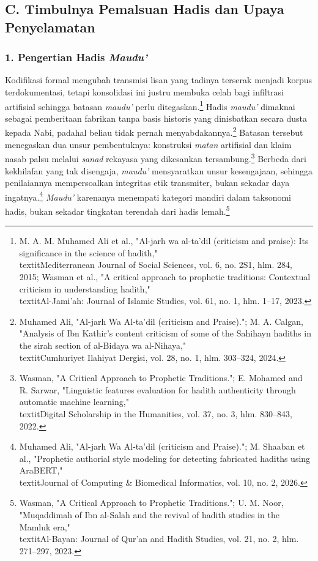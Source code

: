 \subsection*{C. Timbulnya Pemalsuan Hadis dan Upaya Penyelamatan}

\subsubsection*{1. Pengertian Hadis \textit{Maudu'}}

Kodifikasi formal mengubah transmisi lisan yang tadinya terserak menjadi korpus terdokumentasi, tetapi konsolidasi ini justru membuka celah bagi infiltrasi artifisial sehingga batasan \textit{maudu'} perlu ditegaskan.\footnote{M. A. M. Muhamed Ali et al., "Al-jarh wa al-ta'dil (criticism and praise): Its significance in the science of hadith," \\textit{Mediterranean Journal of Social Sciences}, vol. 6, no. 2S1, hlm. 284, 2015; Wasman et al., "A critical approach to prophetic traditions: Contextual criticism in understanding hadith," \\textit{Al-Jami'ah: Journal of Islamic Studies}, vol. 61, no. 1, hlm. 1--17, 2023.} Hadis \textit{maudu'} dimaknai sebagai pemberitaan fabrikan tanpa basis historis yang dinisbatkan secara dusta kepada Nabi, padahal beliau tidak pernah menyabdakannya.\footnote{Muhamed Ali, "Al-jarh Wa Al-ta'dil (criticism and Praise)."; M. A. Calgan, "Analysis of Ibn Kathir's content criticism of some of the Sahihayn hadiths in the sirah section of al-Bidaya wa al-Nihaya," \\textit{Cumhuriyet Ilahiyat Dergisi}, vol. 28, no. 1, hlm. 303--324, 2024.} Batasan tersebut menegaskan dua unsur pembentuknya: konstruksi \textit{matan} artifisial dan klaim nasab palsu melalui \textit{sanad} rekayasa yang dikesankan tersambung.\footnote{Wasman, "A Critical Approach to Prophetic Traditions."; E. Mohamed and R. Sarwar, "Linguistic features evaluation for hadith authenticity through automatic machine learning," \\textit{Digital Scholarship in the Humanities}, vol. 37, no. 3, hlm. 830--843, 2022.} Berbeda dari kekhilafan yang tak disengaja, \textit{maudu'} mensyaratkan unsur kesengajaan, sehingga penilaiannya mempersoalkan integritas etik transmiter, bukan sekadar daya ingatnya.\footnote{Muhamed Ali, "Al-jarh Wa Al-ta'dil (criticism and Praise)."; M. Shaaban et al., "Prophetic authorial style modeling for detecting fabricated hadiths using AraBERT," \\textit{Journal of Computing & Biomedical Informatics}, vol. 10, no. 2, 2026.} \textit{Maudu'} karenanya menempati kategori mandiri dalam taksonomi hadis, bukan sekadar tingkatan terendah dari hadis lemah.\footnote{Wasman, "A Critical Approach to Prophetic Traditions."; U. M. Noor, "Muqaddimah of Ibn al-Salah and the revival of hadith studies in the Mamluk era," \\textit{Al-Bayan: Journal of Qur'an and Hadith Studies}, vol. 21, no. 2, hlm. 271--297, 2023.}

